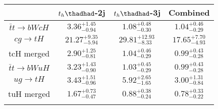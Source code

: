 \centering
\begin{tabular}{cccc} \toprule\toprule
 & $t_h\thadhad$-2j & $t_h\thadhad$-3j & Combined\\\midrule
$\bar{t}t\to bWcH$ & $3.36^{+1.45}_{-0.94}$ & $1.08^{+0.48}_{-0.30}$ & $1.04^{+0.46}_{-0.29}$\\
$cg\to tH$ & $21.27^{+9.35}_{-5.94}$ & $29.81^{+12.93}_{-8.33}$ & $17.65^{+7.70}_{-4.93}$\\
tcH merged & $2.90^{+1.25}_{-0.81}$ & $1.04^{+0.46}_{-0.29}$ & $0.99^{+0.43}_{-0.28}$\\
$\bar{t}t\to bWuH$ & $3.23^{+1.43}_{-0.90}$ & $1.03^{+0.45}_{-0.29}$ & $0.99^{+0.43}_{-0.28}$\\
$ug\to tH$ & $3.43^{+1.51}_{-0.96}$ & $5.92^{+2.65}_{-1.65}$ & $3.00^{+1.31}_{-0.84}$\\
tuH merged & $1.67^{+0.73}_{-0.47}$ & $0.88^{+0.38}_{-0.24}$ & $0.78^{+0.33}_{-0.22}$\\
\bottomrule\bottomrule\\
\end{tabular}